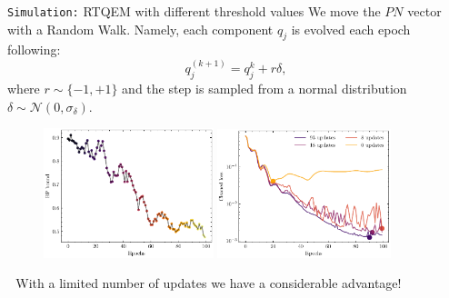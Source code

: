 \documentclass[8pt, xcolor={svgnames}, hyperref={linkcolor=black}, aspectratio=169]{beamer}
\begin{document}
\begin{frame}{\texttt{Simulation:} RTQEM with different threshold values}
We move the $PN$ vector with a Random Walk. Namely, each component 
$q_j$ is evolved each epoch following:
$$q_j^{(k+1)} = q_j^{k} + r\delta,$$
where $r\sim\{-1,+1\}$ and the step is sampled from a normal distribution 
$\delta\sim\mathcal{N}(0,\sigma_{\delta})$.
\begin{figure}
    \includegraphics[width=0.44\textwidth]{figures/bound_variation.pdf}%
    \includegraphics[width=0.45\textwidth]{figures/cleaned_losses.pdf}
\end{figure}
\centering
\faEnvelope\,\, With a limited number of updates we have a considerable advantage!
\end{frame}
\end{document}

